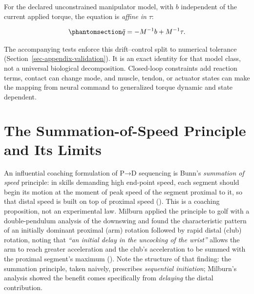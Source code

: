 \documentclass[
  letterpaper,
]{report}
\begin{document}
For the declared unconstrained manipulator model, with \(b\) independent
of the current applied torque, the equation is \emph{affine in}
\(\tau\):

\begin{equation}\phantomsection\label{eq-affine-split}{
\ddot q = -M^{-1}b + M^{-1}\tau.
}\end{equation}

The accompanying tests enforce this drift--control split to numerical
tolerance (Section~\ref{sec-appendix-validation}). It is an exact
identity for that model class, not a universal biological decomposition.
Closed-loop constraints add reaction terms, contact can change mode, and
muscle, tendon, or actuator states can make the mapping from neural
command to generalized torque dynamic and state dependent.

\section{The Summation-of-Speed Principle and Its
Limits}\label{sec-summation}

An influential coaching formulation of P→D sequencing is Bunn's
\emph{summation of speed} principle: in skills demanding high end-point
speed, each segment should begin its motion at the moment of peak speed
of the segment proximal to it, so that distal speed is built on top of
proximal speed (). This is a coaching
proposition, not an experimental law. Milburn applied the principle to
golf with a double-pendulum analysis of the downswing and found the
characteristic pattern of an initially dominant proximal (arm) rotation
followed by rapid distal (club) rotation, noting that \emph{``an initial
delay in the uncocking of the wrist''} allows the arm to reach greater
acceleration and the club's acceleration to be summed with the proximal
segment's maximum (). Note the
structure of that finding: the summation principle, taken naively,
prescribes \emph{sequential initiation}; Milburn's analysis showed the
benefit comes specifically from \emph{delaying} the distal contribution.
\end{document}
